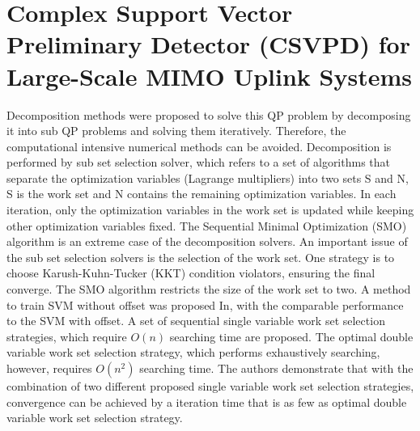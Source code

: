 \resetdatestamp



\chapter{Complex Support Vector Preliminary Detector (CSVPD) for Large-Scale MIMO Uplink Systems}
Decomposition methods were proposed to solve this QP problem by decomposing it into sub QP problems and solving them iteratively\cite{platt1999fast}. Therefore, the computational intensive numerical methods can be avoided. Decomposition is performed by sub set selection solver, which refers to a set of algorithms that separate the optimization variables (Lagrange multipliers) into two sets S and N, S is the work set and N contains the remaining optimization variables. In each iteration, only the optimization variables in the work set is updated while keeping other optimization variables fixed. The Sequential Minimal Optimization (SMO) algorithm\cite{platt1999fast} is an extreme case of the decomposition solvers. An important issue of the sub set selection solvers is the selection of the work set. One strategy is to choose Karush-Kuhn-Tucker (KKT) condition violators, ensuring the final converge\cite{osuna1997improved}. The SMO algorithm restricts the size of the work set to two. A method to train SVM without offset was proposed In\cite{steinwart2011training}, with the comparable performance to the SVM with offset. A set of sequential single variable work set selection strategies, which require $O(n)$ searching time are proposed. The optimal double variable work set selection strategy, which performs exhaustively searching, however, requires $O(n^{2})$ searching time. The authors demonstrate that with the combination of two different proposed single variable work set selection strategies, convergence can be achieved by a iteration time that is as few as optimal double variable work set selection strategy.

